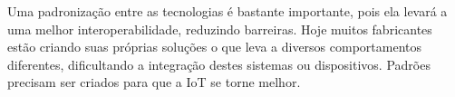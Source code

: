Uma padronização entre as tecnologias é bastante importante, pois ela levará a uma melhor interoperabilidade, reduzindo barreiras. Hoje muitos fabricantes estão criando suas próprias soluções o que leva a diversos comportamentos diferentes, dificultando a integração destes sistemas ou dispositivos. Padrões precisam ser criados para que a IoT se torne melhor.